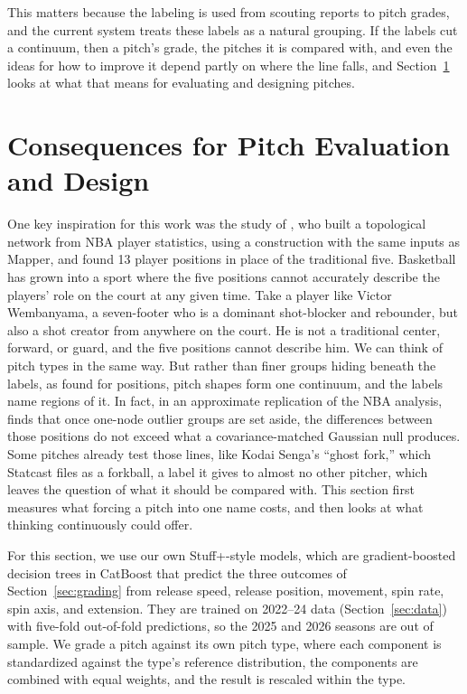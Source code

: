 \documentclass[11pt]{article}
\theoremstyle{definition}
\theoremstyle{remark}
\begin{document}
This matters because the labeling is used from scouting reports to pitch grades, and the current system treats these labels as a natural grouping.
If the labels cut a continuum, then a pitch's grade, the pitches it is compared with, and even the ideas for how to improve it depend partly on where the line falls, and Section~\ref{sec:consequences} looks at what that means for evaluating and designing pitches.

\section{Consequences for Pitch Evaluation and Design}\label{sec:consequences}
One key inspiration for this work was the study of \textcite{lum2013extracting}, who built a topological network from NBA player statistics, using a construction with the same inputs as Mapper, and found 13 player positions in place of the traditional five.
Basketball has grown into a sport where the five positions cannot accurately describe the players' role on the court at any given time.
Take a player like Victor Wembanyama, a seven-footer who is a dominant shot-blocker and rebounder, but also a shot creator from anywhere on the court. He is not a traditional center, forward, or guard, and the five positions cannot describe him.
We can think of pitch types in the same way.
But rather than finer groups hiding beneath the labels, as \textcite{lum2013extracting} found for positions, pitch shapes form one continuum, and the labels name regions of it.
In fact, in an approximate replication of the NBA analysis, \textcite{topaz2026null} finds that once one-node outlier groups are set aside, the differences between those positions do not exceed what a covariance-matched Gaussian null produces.
Some pitches already test those lines, like Kodai Senga's ``ghost fork,'' which Statcast files as a forkball, a label it gives to almost no other pitcher, which leaves the question of what it should be compared with.
This section first measures what forcing a pitch into one name costs, and then looks at what thinking continuously could offer.

For this section, we use our own Stuff+-style models, which are gradient-boosted decision trees in CatBoost \parencite{dorogush2018catboost} that predict the three outcomes of Section~\ref{sec:grading} from release speed, release position, movement, spin rate, spin axis, and extension.
They are trained on 2022--24 data (Section~\ref{sec:data}) with five-fold out-of-fold predictions, so the 2025 and 2026 seasons are out of sample.
We grade a pitch against its own pitch type, where each component is standardized against the type's reference distribution, the components are combined with equal weights, and the result is rescaled within the type.
\end{document}
